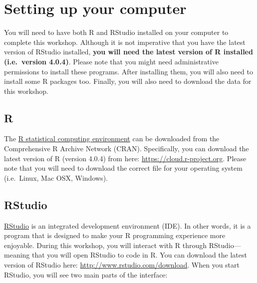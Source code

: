 \documentclass[
  12pt,
]{book}
\begin{document}
\hypertarget{setup}{%
\section{Setting up your computer}\label{setup}}

You will need to have both R and RStudio installed on your computer to complete this workshop. Although it is not imperative that you have the latest version of RStudio installed, \textbf{you will need the latest version of R installed (i.e.~version 4.0.4)}. Please note that you might need administrative permissions to install these programs. After installing them, you will also need to install some R packages too. Finally, you will also need to download the data for this workshop.

\hypertarget{r}{%
\subsection{R}\label{r}}

The \href{https://www.r-project.org}{R statistical computing environment} can be downloaded from the Comprehensive R Archive Network (CRAN). Specifically, you can download the latest version of R (version 4.0.4) from here: \url{https://cloud.r-project.org}. Please note that you will need to download the correct file for your operating system (i.e.~Linux, Mac OSX, Windows).

\hypertarget{rstudio}{%
\subsection{RStudio}\label{rstudio}}

\href{https://www.rstudio.com}{RStudio} is an integrated development environment (IDE). In other words, it is a program that is designed to make your R programming experience more enjoyable. During this workshop, you will interact with R through RStudio---meaning that you will open RStudio to code in R. You can download the latest version of RStudio here: \url{http://www.rstudio.com/download}. When you start RStudio, you will see two main parts of the interface:
\end{document}
